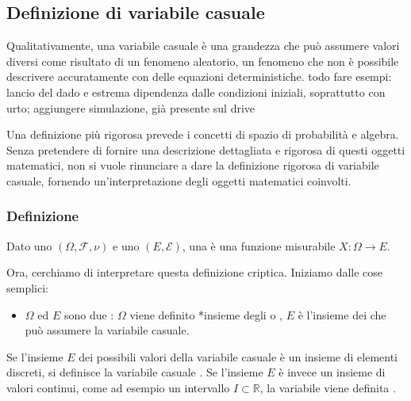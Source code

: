\documentclass[letterpaper,10pt,italian]{jupyterBook}
\begin{document}
\sphinxstepscope


\subsection{Definizione di variabile casuale}
\label{\detokenize{ch/statistics/random_variables_definition:definizione-di-variabile-casuale}}\label{\detokenize{ch/statistics/random_variables_definition:statistics-hs-random-variables-def}}\label{\detokenize{ch/statistics/random_variables_definition::doc}}
\sphinxAtStartPar
Qualitativamente, una variabile casuale è una grandezza che può assumere valori diversi come risultato di un fenomeno aleatorio, un fenomeno che non è possibile descrivere accuratamente con delle equazioni deterministiche. todo fare esempi: lancio del dado e estrema dipendenza dalle condizioni iniziali, soprattutto con urto; aggiungere simulazione, già presente sul drive

\sphinxAtStartPar
Una definizione più rigorosa prevede i concetti di spazio di probabilità e
\sphinxhyphen{}algebra. Senza pretendere di fornire una descrizione dettagliata e rigorosa di questi oggetti matematici, non si vuole rinunciare a dare la definizione rigorosa di variabile casuale, fornendo un’interpretazione degli oggetti matematici coinvolti.


\subsubsection{Definizione}
\label{\detokenize{ch/statistics/random_variables_definition:definizione}}
\sphinxAtStartPar
Dato uno  \((\Omega, \mathcal{F}, \nu)\) e uno  \((E, \mathcal{E})\), una  è una funzione misurabile \(X: \Omega \rightarrow E\).

\sphinxAtStartPar
Ora, cerchiamo di interpretare questa definizione criptica. Iniziamo dalle cose semplici:
\begin{itemize}
\item {} 
\sphinxAtStartPar
\(\Omega\) ed \(E\) sono due : \(\Omega\) viene definito *insieme degli  o , \(E\) è l’insieme dei  che può assumere la variabile casuale.

\end{itemize}

\sphinxAtStartPar
Se l’insieme \(E\) dei possibili valori della variabile casuale è un insieme di elementi discreti, si definisce la variabile casuale .
Se l’insieme \(E\) è invece un insieme di valori continui, come ad esempio un intervallo \(I \subset \mathbb{R}\), la variabile viene definita .
\end{document}
